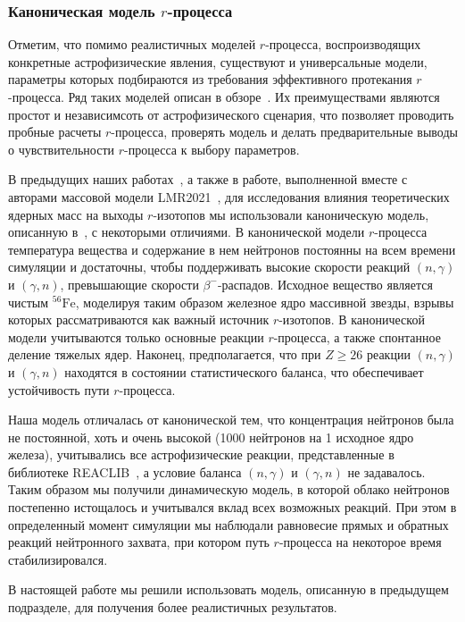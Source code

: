 \subsubsection{Каноническая модель $r$-процесса}
Отметим, что помимо реалистичных моделей $r$-процесса, воспроизводящих конкретные астрофизические явления, существуют и универсальные модели, параметры которых подбираются из требования эффективного протекания $r$-процесса. Ряд таких моделей описан в обзоре~\cite{arnould2007}. Их преимуществами являются простот и независимсоть от астрофизического сценария, что позволяет проводить пробные расчеты $r$-процесса, проверять модель и делать предварительные выводы о чувствительности $r$-процесса к выбору параметров.

В предыдущих наших работах~\cite{my-vestnik2021,my-iran2022,my-pos2022}, а также в работе, выполненной вместе с авторами массовой модели LMR2021~\cite{vladimirova2022}, для исследования влияния теоретических ядерных масс на выходы $r$-изотопов мы использовали каноническую модель, описанную в~\cite{arnould2007}, с некоторыми отличиями. В канонической модели $r$-процесса температура вещества и содержание в нем нейтронов постоянны на всем времени симуляции и достаточны, чтобы поддерживать высокие скорости реакций $(n,\gamma)$ и $(\gamma,n)$, превышающие скорости $\beta^-$-распадов. Исходное вещество является чистым ${}^{56}\text{Fe}$, моделируя таким образом железное ядро массивной звезды, взрывы которых рассматриваются как важный источник $r$-изотопов. В канонической модели учитываются только основные реакции $r$-процесса, а также спонтанное деление тяжелых ядер. Наконец, предполагается, что при $Z \geq 26$ реакции $(n,\gamma)$ и $(\gamma,n)$ находятся в состоянии статистического баланса, что обеспечивает устойчивость пути $r$-процесса.

Наша модель отличалась от канонической тем, что концентрация нейтронов была не постоянной, хоть и очень высокой (1000 нейтронов на 1 исходное ядро железа), учитывались все астрофизические реакции, представленные в библиотеке REACLIB~\cite{reaclib2010}, а условие баланса $(n,\gamma)$ и $(\gamma,n)$ не задавалось. Таким образом мы получили динамическую модель, в которой облако нейтронов постепенно истощалось и учитывался вклад всех возможных реакций. При этом в определенный момент симуляции мы наблюдали равновесие прямых и обратных реакций нейтронного захвата, при котором путь $r$-процесса на некоторое время стабилизировался.

В настоящей работе мы решили использовать модель, описанную в предыдущем подразделе, для получения более реалистичных результатов.
